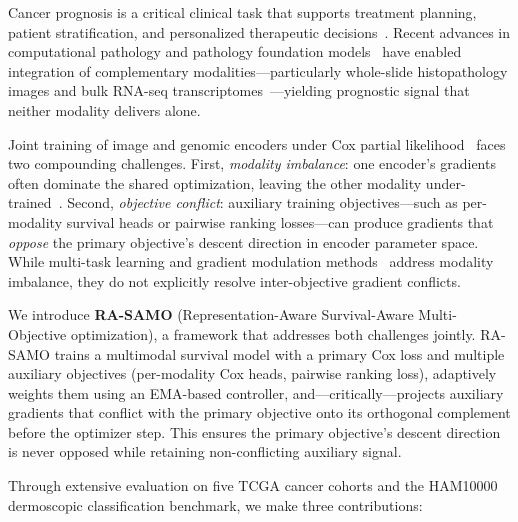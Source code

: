 \documentclass[10pt,twocolumn]{article}
\begin{document}
Cancer prognosis is a critical clinical task that supports treatment
planning, patient stratification, and personalized therapeutic
decisions~\cite{who2024}. Recent advances in computational pathology
and pathology foundation models~\cite{chen2024uni, vorontsov2024virchow,
lu2024conch} have enabled integration of complementary
modalities---particularly whole-slide histopathology images and bulk
RNA-seq transcriptomes~\cite{chen2021, chen2022porpoise,
acosta2022}---yielding prognostic signal that neither modality delivers
alone.

Joint training of image and genomic encoders under Cox partial
likelihood~\cite{cox1972} faces two compounding challenges.
First, \textit{modality imbalance}: one encoder's gradients often
dominate the shared optimization, leaving the other modality
under-trained~\cite{wang2020what, peng2022ogm}. Second,
\textit{objective conflict}: auxiliary training objectives---such as
per-modality survival heads or pairwise ranking
losses---can produce gradients that \textit{oppose} the primary
objective's descent direction in encoder parameter space. While
multi-task learning and gradient modulation
methods~\cite{peng2022ogm, du2023unimodal, fan2023pmr} address
modality imbalance, they do not explicitly resolve inter-objective
gradient conflicts.

We introduce \textbf{RA-SAMO} (Representation-Aware Survival-Aware
Multi-Objective optimization), a framework that addresses both
challenges jointly. RA-SAMO trains a multimodal survival model with a
primary Cox loss and multiple auxiliary objectives (per-modality Cox
heads, pairwise ranking loss), adaptively weights them using an
EMA-based controller, and---critically---projects auxiliary gradients
that conflict with the primary objective onto its orthogonal
complement before the optimizer step. This ensures the primary
objective's descent direction is never opposed while retaining
non-conflicting auxiliary signal.

Through extensive evaluation on five TCGA cancer cohorts and the
HAM10000 dermoscopic classification benchmark, we make three
contributions:
\end{document}
